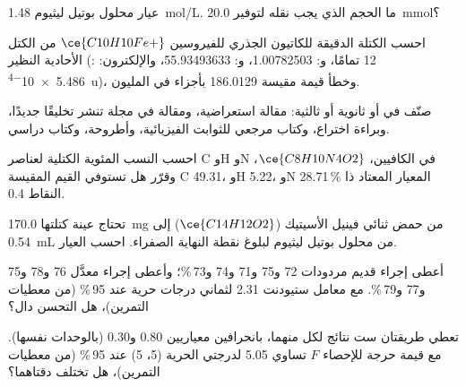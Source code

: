 \begin{exercise}[$\star$]\label{exo:b3:lab-techniques-3:2}
عيار محلول بوتيل ليثيوم \qty{1.48}{mol/L}. ما الحجم الذي يجب نقله لتوفير
\qty{20.0}{mmol}؟
\end{exercise}

\begin{exercise}[$\star$]\label{exo:b3:lab-techniques-3:3}
احسب الكتلة الدقيقة للكاتيون الجذري للفيروسين $\ce{C10H10Fe+}$ من الكتل الأحادية النظير
(: 12 تمامًا، و: 1.00782503، و: 55.93493633، والإلكترون: \qty{5.486e-4}{u})، وخطأ قيمة مقيسة
186.0129 بأجزاء في المليون.
\end{exercise}

\begin{exercise}[$\star$]\label{exo:b3:lab-techniques-3:4}
صنّف في  أو ثانوية أو ثالثية: مقالة استعراضية، 
ومقالة في مجلة تنشر تخليقًا جديدًا، وبراءة اختراع، وكتاب مرجعي للثوابت
الفيزيائية، وأطروحة، وكتاب دراسي.
\end{exercise}

\begin{exercise}[$\star\star$]\label{exo:b3:lab-techniques-3:5}
احسب النسب المئوية الكتلية لعناصر C وH وN في الكافيين، $\ce{C8H10N4O2}$، وقرّر هل تستوفي
القيم المقيسة C 49.31، وH 5.22، وN 28.71\,\% المعيار المعتاد ذا النقاط 0.4.
\end{exercise}

\begin{exercise}[$\star\star$]\label{exo:b3:lab-techniques-3:6}
تحتاج عينة كتلتها \qty{170.0}{mg} من حمض ثنائي فينيل الأسيتيك ($\ce{C14H12O2}$) إلى \qty{0.54}{mL} من محلول بوتيل ليثيوم لبلوغ
نقطة النهاية الصفراء. احسب العيار.
\end{exercise}

\begin{exercise}[$\star\star$]\label{exo:b3:lab-techniques-3:7}
أعطى إجراء قديم مردودات 72 و75 و71 و74 و73\,\%؛ وأعطى إجراء معدَّل 76 و78 و75 و77 
و79\,\%. مع معامل ستيودنت 2.31 لثماني درجات حرية عند 95\,\% (من معطيات التمرين)،
هل التحسن دال؟
\end{exercise}

\begin{exercise}[$\star\star$]\label{exo:b3:lab-techniques-3:8}
تعطي طريقتان ست نتائج لكل منهما، بانحرافين معياريين 0.80 و0.30 (بالوحدات
نفسها). مع قيمة حرجة للإحصاء $F$ تساوي 5.05 لدرجتي الحرية (5، 5) عند 95\,\% (من معطيات
التمرين)، هل تختلف دقتاهما؟
\end{exercise}


